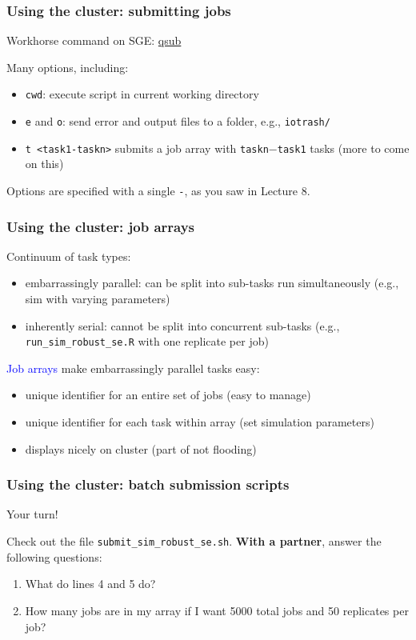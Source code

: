 \documentclass[12pt, 
hyperref={colorlinks=true, linkcolor=BlueViolet, urlcolor=BlueViolet},dvipsnames]{beamer}
\begin{document}
\begin{frame}
\frametitle{Using the cluster: submitting jobs}
Workhorse command on SGE: \href{http://gridscheduler.sourceforge.net/htmlman/htmlman1/qsub.html}{qsub}

Many options, including: \vspace{-0.3cm} \pause
\begin{itemize}
\item \texttt{cwd}: execute script in current working directory \pause
\item \texttt{e} and \texttt{o}: send error and output files to a folder, e.g., \texttt{iotrash/} \pause
\item \texttt{t <task1-taskn>} submits a job array with \texttt{taskn}$-$\texttt{task1} tasks \pause (more to come on this)
\end{itemize}

Options are specified with a single \texttt{-}, as you saw in Lecture 8.
\end{frame}

\begin{frame}
\frametitle{Using the cluster: job arrays}

Continuum of task types: \vspace{-0.3cm} \pause
\begin{itemize}
\item embarrassingly parallel: \pause can be split into sub-tasks run simultaneously \pause (e.g., sim with varying parameters)
\item inherently serial: \pause cannot be split into concurrent sub-tasks \pause (e.g., \texttt{run\_sim\_robust\_se.R} with one replicate per job) \pause
\end{itemize}

\textcolor{blue}{Job arrays} make embarrassingly parallel tasks easy: \vspace{-0.3cm} \pause
\begin{itemize}
\item unique identifier for an entire set of jobs \pause (easy to manage) \pause
\item unique identifier for each task within array \pause (set simulation parameters) \pause
\item displays nicely on cluster \pause (part of not flooding) 
\end{itemize}
\end{frame}

\begin{frame}
\frametitle{Using the cluster: batch submission scripts}

Your turn!

Check out the file \texttt{submit\_sim\_robust\_se.sh}. \textbf{With a partner}, answer the following questions: \vspace{-0.3cm}
\begin{enumerate}
\item What do lines 4 and 5 do? 
\item How many jobs are in my array if I want 5000 total jobs and 50 replicates per job?
\end{enumerate}

\end{frame}
\end{document}
